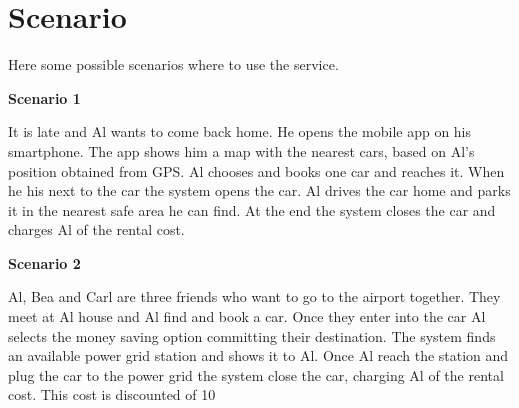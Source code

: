 \section{Scenario}
Here some possible scenarios where to use the service.
\begin{large}
\textbf{Scenario 1}
\end{large}
It is late and Al wants to come back home. He opens the mobile app on his smartphone. The app shows him a map with the nearest cars, based on Al's position obtained from GPS. Al chooses and books one car and reaches it. When he his next to the car the system opens the car. Al drives the car home and parks it in the nearest safe area he can find. At the end the system closes the car and charges Al of the rental cost.
\begin{large}
\textbf{Scenario 2}
\end{large}
Al, Bea and Carl are three friends who want to go to the airport together. They meet at Al house and Al find and book a car. Once they enter into the car Al selects the money saving option committing their destination. The system finds an available power grid station and shows it to Al. Once Al reach the station and plug the car to the power grid the system close the car, charging Al of the rental cost. This cost is discounted of 10%